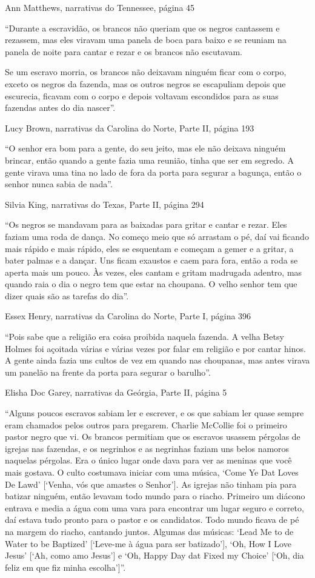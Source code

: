 Ann Matthews, narrativas do Tennessee, página 45

``Durante a escravidão, os brancos não queriam que os negros cantassem e
rezassem, mas eles viravam uma panela de boca para baixo e se reuniam na
panela de noite para cantar e rezar e os brancos não escutavam.

Se um escravo morria, os brancos não deixavam ninguém ficar com o corpo,
exceto os negros da fazenda, mas os outros negros se escapuliam depois
que escurecia, ficavam com o corpo e depois voltavam escondidos para as
suas fazendas antes do dia nascer''.

Lucy Brown, narrativas da Carolina do Norte, Parte II, página 193

``O senhor era bom para a gente, do seu jeito, mas ele não deixava
ninguém brincar, então quando a gente fazia uma reunião, tinha que ser
em segredo. A gente virava uma tina no lado de fora da porta para
segurar a bagunça, então o senhor nunca sabia de nada''.

Silvia King, narrativas do Texas, Parte II, página 294

``Os negros se mandavam para as baixadas para gritar e cantar e rezar.
Eles faziam uma roda de dança. No começo meio que só arrastam o pé, daí
vai ficando mais rápido e mais rápido, eles se esquentam e começam a
gemer e a gritar, a bater palmas e a dançar. Uns ficam exaustos e caem
para fora, então a roda se aperta mais um pouco. Às vezes, eles cantam e
gritam madrugada adentro, mas quando raia o dia o negro tem que estar na
choupana. O velho senhor tem que dizer quais são as tarefas do dia''.

Essex Henry, narrativas da Carolina do Norte, Parte I, página 396

``Pois sabe que a religião era coisa proibida naquela fazenda. A velha
Betsy Holmes foi açoitada várias e várias vezes por falar em religião e
por cantar hinos. A gente ainda fazia uns cultos de vez em quando nas
choupanas, mas antes virava um panelão na frente da porta para segurar o
barulho''.

Elisha Doc Garey, narrativas da Geórgia, Parte II, página 5

``Alguns poucos escravos sabiam ler e escrever, e os que sabiam ler
quase sempre eram chamados pelos outros para pregarem. Charlie McCollie
foi o primeiro pastor negro que vi. Os brancos permitiam que os escravos
usassem pérgolas de igrejas nas fazendas, e os negrinhos e as negrinhas
faziam uns belos namoros naquelas pérgolas. Era o único lugar onde dava
para ver as meninas que você mais gostava. O culto costumava iniciar com
uma música, `Come Ye Dat Loves De Lawd' {[}`Venha, vós que amastes o
Senhor'{]}. As igrejas não tinham pia para batizar ninguém, então
levavam todo mundo para o riacho. Primeiro um diácono entrava e media a
água com uma vara para encontrar um lugar seguro e correto, daí estava
tudo pronto para o pastor e os candidatos. Todo mundo ficava de pé na
margem do riacho, cantando juntos. Algumas das músicas: `Lead Me to de
Water to be Baptized' {[}`Leve-me à água para ser batizado'{]}, `Oh, How
I Love Jesus' {[}`Ah, como amo Jesus'{]} e `Oh, Happy Day dat Fixed my
Choice' {[}`Oh, dia feliz em que fiz minha escolha'{]}''.

